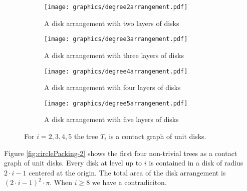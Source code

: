 \documentclass[10pt]{CSUNthesis}
\theoremstyle{plain}%
\theoremstyle{definition}
\theoremstyle{remark}
\begin{document}
\begin{figure}[!htpb]\label{fig:circlePacking-2}
\begin{center}
  \begin{subfigure}[b]{0.24\textwidth}
	  \texttt{[image: graphics/degree2arrangement.pdf]}
	  \caption{A disk arrangement with two layers of disks}
	  \label{fig:circlePacking2-1}
  \end{subfigure}
  \begin{subfigure}[b]{0.24\textwidth}
	  \texttt{[image: graphics/degree3arrangement.pdf]}
	  \caption{A disk arrangement with three layers of disks}
	  \label{fig:circlePacking2-2}
  \end{subfigure}
  \begin{subfigure}[b]{0.24\textwidth}
	  \texttt{[image: graphics/degree4arrangement.pdf]}
	  \caption{A disk arrangement with four layers of disks}
	  \label{fig:circlePacking2-3}
  \end{subfigure}
  \begin{subfigure}[b]{0.24\textwidth}
	  \texttt{[image: graphics/degree5arrangement.pdf]}
	  \caption{A disk arrangement with five layers of disks}
	  \label{fig:circlePacking2-4}
  \end{subfigure}
\end{center} 
\caption{For $i=2,3,4,5$ the tree $T_i$ is a contact graph of unit disks.}\label{fig:circlePacking-1}
\end{figure}
Figure \ref{fig:circlePacking-2} shows the first four non-trivial trees as a contact graph of unit disks.
Every disk at level up to $i$ is contained in a disk of radius $2\cdot i - 1$ centered at the origin.
The total area of the disk arrangement is $(2\cdot i -1)^2 \cdot \pi$. 
When $i\geq 8$ we have a contradiciton.%
\end{document}
